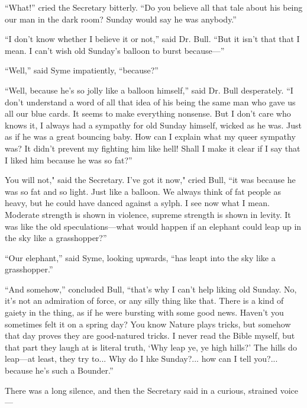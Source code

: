 \documentclass{book}
\begin{document}
“What!” cried the Secretary bitterly. “Do you believe all that tale about his being our man in the dark room? Sunday would say he was anybody.”

“I don’t know whether I believe it or not,” said Dr. Bull. “But it isn’t that that I mean. I can’t wish old Sunday’s balloon to burst because—”

“Well,” said Syme impatiently, “because?”

“Well, because he’s so jolly like a balloon himself,” said Dr. Bull desperately. “I don’t understand a word of all that idea of his being the same man who gave us all our blue cards. It seems to make everything nonsense. But I don’t care who knows it, I always had a sympathy for old Sunday himself, wicked as he was. Just as if he was a great bouncing baby. How can I explain what my queer sympathy was? It didn’t prevent my fighting him like hell! Shall I make it clear if I say that I liked him because he was so fat?”

You will not," said the Secretary. I’ve got it now," cried Bull, “it was because he was so fat and so light. Just like a balloon. We always think of fat people as heavy, but he could have danced against a sylph. I see now what I mean. Moderate strength is shown in violence, supreme strength is shown in levity. It was like the old speculations—what would happen if an elephant could leap up in the sky like a grasshopper?”

“Our elephant,” said Syme, looking upwards, “has leapt into the sky like a grasshopper.”

“And somehow,” concluded Bull, “that’s why I can’t help liking old Sunday. No, it’s not an admiration of force, or any silly thing like that. There is a kind of gaiety in the thing, as if he were bursting with some good news. Haven’t you sometimes felt it on a spring day? You know Nature plays tricks, but somehow that day proves they are good-natured tricks. I never read the Bible myself, but that part they laugh at is literal truth, ‘Why leap ye, ye high hills?’ The hills do leap—at least, they try to... Why do I hke Sunday?... how can I tell you?... because he’s such a Bounder.”

There was a long silence, and then the Secretary said in a curious, strained voice—
\end{document}
